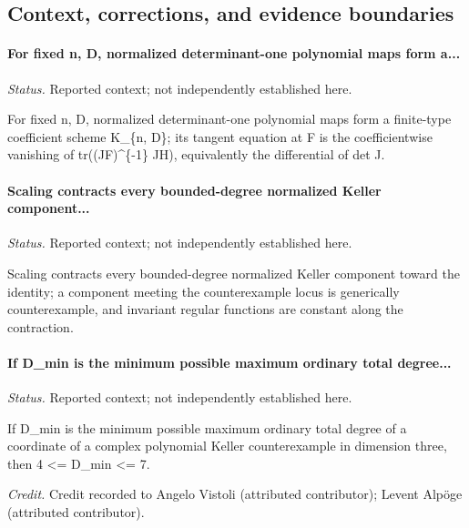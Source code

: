 \subsection{Context, corrections, and evidence boundaries}

\label{supp-note-02-030}
\paragraph{For fixed n, D, normalized determinant-one polynomial maps form a...}
\emph{Status.} Reported context; not independently established here.

For fixed n, D, normalized determinant-one polynomial maps form a finite-type coefficient scheme K\_\{n, D\}; its tangent equation at F is the coefficientwise vanishing of tr((JF)\textasciicircum{}\{-1\} JH), equivalently the differential of det J.

\label{supp-note-02-031}
\paragraph{Scaling contracts every bounded-degree normalized Keller component...}
\emph{Status.} Reported context; not independently established here.

Scaling contracts every bounded-degree normalized Keller component toward the identity; a component meeting the counterexample locus is generically counterexample, and invariant regular functions are constant along the contraction.

\label{supp-note-02-032}
\paragraph{If D\_min is the minimum possible maximum ordinary total degree...}
\emph{Status.} Reported context; not independently established here.

If D\_min is the minimum possible maximum ordinary total degree of a coordinate of a complex polynomial Keller counterexample in dimension three, then 4 <= D\_min <= 7.

\emph{Credit.} Credit recorded to Angelo Vistoli (attributed contributor); Levent Alpöge (attributed contributor).

\endgroup
